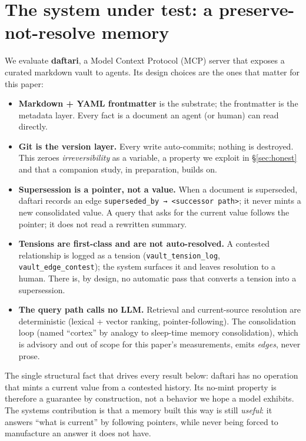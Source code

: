 \documentclass[11pt]{article}
\begin{document}
\section{The system under test: a preserve-not-resolve memory}
\label{sec:system}

We evaluate \textbf{daftari}, a Model Context Protocol (MCP) server that exposes a curated
markdown vault to agents. Its design choices are the ones that matter for this paper:

\begin{itemize}
\item \textbf{Markdown + YAML frontmatter} is the substrate; the frontmatter is the metadata layer.
  Every fact is a document an agent (or human) can read directly.
\item \textbf{Git is the version layer.} Every write auto-commits; nothing is destroyed. This zeroes
  \emph{irreversibility} as a variable, a property we exploit in \S\ref{sec:honest} and that a companion study,
  in preparation, builds on.
\item \textbf{Supersession is a pointer, not a value.} When a document is superseded, daftari records
  an edge \texttt{superseded\_by → <successor path>}; it never mints a new consolidated value. A
  query that asks for the current value follows the pointer; it does not read a rewritten
  summary.
\item \textbf{Tensions are first-class and are not auto-resolved.} A contested relationship is logged
  as a tension (\texttt{vault\_tension\_log}, \texttt{vault\_edge\_contest}); the system surfaces it and
  leaves resolution to a human. There is, by design, no automatic pass that converts a
  tension into a supersession.
\item \textbf{The query path calls no LLM.} Retrieval and current-source resolution are deterministic
  (lexical + vector ranking, pointer-following). The consolidation loop (named ``cortex'' by
  analogy to sleep-time memory consolidation), which is advisory and out of scope for this
  paper's measurements, emits \emph{edges}, never prose.
\end{itemize}

The single structural fact that drives every result below: daftari has no operation that
mints a current value from a contested history. Its no-mint property is therefore a
guarantee by construction, not a behavior we hope a model exhibits. The systems contribution
is that a memory built this way is still \emph{useful}: it answers ``what is current'' by
following pointers, while never being forced to manufacture an answer it does not have.
\end{document}
